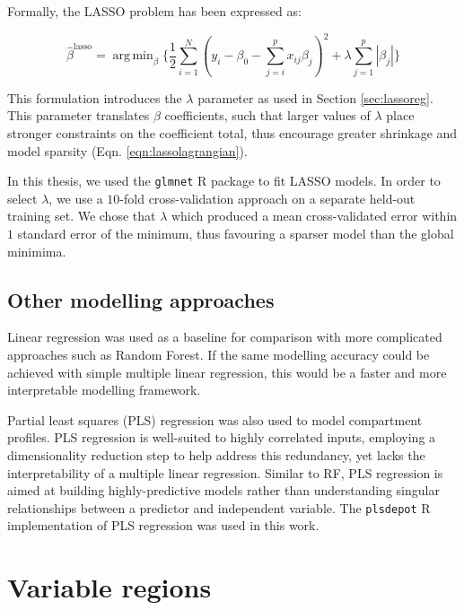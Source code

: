 \documentclass[a4paper,11pt,oneside]{book}
\DeclareMathOperator*{\argmin}{arg\,min}
\begin{document}
Formally, the LASSO problem has been expressed as:\cite{Hastie2001}

\begin{equation}\label{eqn:lassolagrangian}
\hat{\beta}^\mathrm{lasso} = \argmin_\beta \bigg\{ 
\frac{1}{2} \sum_{i=1}^N (y_i - \beta_0 - \sum_{j=i}^p x_{ij}\beta_j)^2 
+ \lambda \sum_{j=1}^p |\beta_j|
\bigg\}
\end{equation} \vspace{.2em}

This formulation introduces the $\lambda$ parameter as used in Section \ref{sec:lassoreg}. This parameter translates $\beta$ coefficients, such that larger values of $\lambda$ place stronger constraints on the coefficient total, thus encourage greater shrinkage and model sparsity (Eqn. \ref{eqn:lassolagrangian}).

In this thesis, we used the \texttt{glmnet} R package to fit LASSO models.\cite{glmnet1, glmnet2} In order to select $\lambda$, we use a $10$-fold cross-validation approach on a separate held-out training set. We chose that $\lambda$ which produced a mean cross-validated error within $1$ standard error of the minimum, thus favouring a sparser model than the global minimima.

\subsection{Other modelling approaches}\label{meth:othermodels}
 
Linear regression was used as a baseline for comparison with more complicated approaches such as Random Forest. If the same modelling accuracy could be achieved with simple multiple linear regression, this would be a faster and more interpretable modelling framework.

Partial least squares (PLS) regression was also used to model compartment profiles. PLS regression is well-suited to highly correlated inputs, employing a dimensionality reduction step to help address this redundancy, yet lacks the interpretability of a multiple linear regression. Similar to RF, PLS regression is aimed at building highly-predictive models rather than understanding singular relationships between a predictor and independent variable.\cite{Tobias1995} The \texttt{plsdepot} R implementation of PLS regression was used in this work.


\section{Variable regions}\label{variable-regions}
\end{document}
